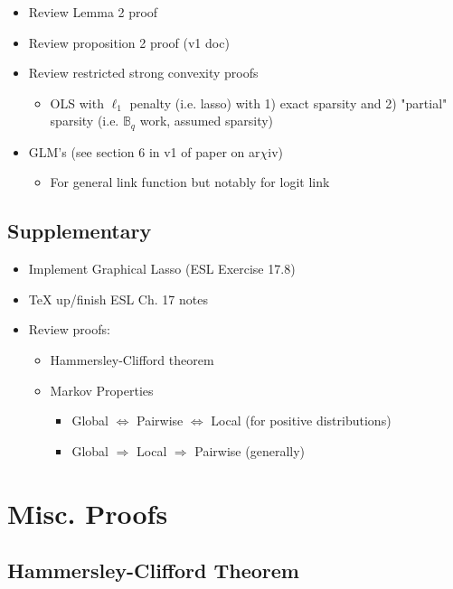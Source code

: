 \documentclass[11pt]{article}
\begin{document}
\begin{itemize}
    \item Review Lemma 2 proof 
    \item Review proposition 2 proof (v1 doc) 
    \item Review restricted strong convexity proofs 
    \begin{itemize}
        \item OLS with $\ell_1$ penalty (i.e. lasso) with 1) exact sparsity and 2) "partial" sparsity (i.e. $\mathbb{B}_q$ work, assumed sparsity)
    \end{itemize}
    \item GLM's (see section 6 in v1 of paper on ar$\chi$iv)
    \begin{itemize}
        \item For general link function but notably for logit link
    \end{itemize}
\end{itemize}


\subsection*{Supplementary}

\begin{itemize}
    \item Implement Graphical Lasso (ESL Exercise 17.8)
    \item TeX up/finish ESL Ch. 17 notes 
    \item Review proofs:
    \begin{itemize}
    	\item Hammersley-Clifford theorem
	    \item Markov Properties  
        \begin{itemize}
            \item Global $\Leftrightarrow$ Pairwise $\Leftrightarrow$ Local (for positive distributions)
            \item Global $\Rightarrow$ Local $\Rightarrow$ Pairwise (generally)
        \end{itemize}
    \end{itemize}
\end{itemize}

\newpage 
\section*{Misc. Proofs}

\subsection*{Hammersley-Clifford Theorem}
\end{document}
